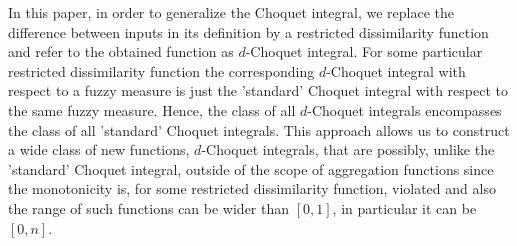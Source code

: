 
In this paper, in order to generalize the Choquet integral, we replace the difference between inputs in its definition by a restricted dissimilarity function and refer to the obtained function as $d$-Choquet integral. For some particular restricted dissimilarity function the corresponding $d$-Choquet integral with respect to a fuzzy measure is just the 'standard' Choquet integral with respect to the same fuzzy measure. Hence, the class of all $d$-Choquet integrals encompasses the class of all 'standard' Choquet integrals. This approach allows us to construct a wide class of new functions, $d$-Choquet integrals, that are possibly, unlike the 'standard' Choquet integral, outside of the scope of aggregation functions since the monotonicity is, for some restricted dissimilarity function, violated and also the range of such functions can be wider than $[0,1]$, in particular it can be $[0,n]$.



